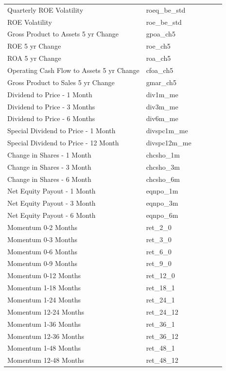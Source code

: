 \documentclass[12pt,title,fleqn]{article}
\begin{document}
\begin{longtable}{p{5cm}p{2cm}p{5cm}lll}
Quarterly ROE Volatility & roeq\_be\_std & & & & \\
ROE Volatility & roe\_be\_std & & & & \\
Gross Product to Assets 5 yr Change & gpoa\_ch5 & & & & \\
ROE 5 yr Change & roe\_ch5 & & & & \\
ROA 5 yr Change & roa\_ch5 & & & & \\
Operating Cash Flow to Assets 5 yr Change & cfoa\_ch5 & & & & \\
Gross Product to Sales 5 yr Change & gmar\_ch5 & & & & \\
Dividend to Price - 1 Month & div1m\_me & & & & \\
Dividend to Price - 3 Months & div3m\_me & & & & \\
Dividend to Price - 6 Months & div6m\_me & & & & \\
Special Dividend to Price - 1 Month & divspc1m\_me & & & \\
Special Dividend to Price - 12 Month & divspc12m\_me & & & & \\
Change in Shares - 1 Month & chcsho\_1m & & & & \\
Change in Shares - 3 Month & chcsho\_3m & & & & \\
Change in Shares - 6 Month & chcsho\_6m & & & & \\
Net Equity Payout - 1 Month & eqnpo\_1m & & & & \\
Net Equity Payout - 3 Month & eqnpo\_3m & & & & \\
Net Equity Payout - 6 Month & eqnpo\_6m & & & & \\
Momentum 0-2 Months & ret\_2\_0 & & & & \\
Momentum 0-3 Months & ret\_3\_0 & & & & \\
Momentum 0-6 Months & ret\_6\_0 & & & & \\
Momentum 0-9 Months & ret\_9\_0 & & & & \\
Momentum 0-12 Months & ret\_12\_0 & & & & \\
Momentum 1-18 Months & ret\_18\_1 & & & & \\
Momentum 1-24 Months & ret\_24\_1 & & & & \\
Momentum 12-24 Months & ret\_24\_12 & & & & \\
Momentum 1-36 Months & ret\_36\_1 & & & & \\
Momentum 12-36 Months & ret\_36\_12 & & & & \\
Momentum 1-48 Months & ret\_48\_1 & & & & \\
Momentum 12-48 Months & ret\_48\_12 & & & & \\

\end{longtable}
\end{document}
